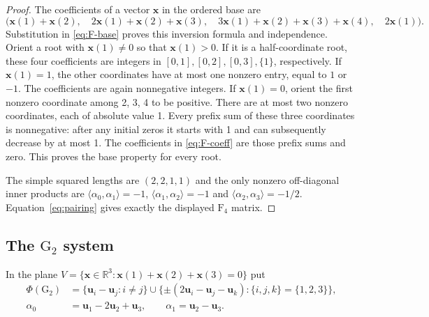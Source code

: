 \documentclass[11pt]{amsart}
\newcommand\re{{\mathbb R}}%
\newcommand\Zu{{\mathbf u}}
\newcommand\Zx{{\mathbf x}}
\newcommand\ip[2]{\langle#1,#2\rangle}
\theoremstyle{definition}
\newcommand{\typ}[1]{\mathrm{#1}}
\begin{document}
\begin{proof}
The coefficients of a vector $\Zx$ in the ordered base are
\begin{equation}\label{eq:F-coeff}
 \bigl(\Zx(1)+\Zx(2),\quad 2\Zx(1)+\Zx(2)+\Zx(3),\quad
 3\Zx(1)+\Zx(2)+\Zx(3)+\Zx(4),\quad 2\Zx(1)\bigr).
\end{equation}
Substitution in \eqref{eq:F-base} proves this inversion formula and
independence. Orient a root with $\Zx(1)\ne0$ so that
$\Zx(1)>0$. If it is a half-coordinate root, these four coefficients
are integers in $[0,1],[0,2],[0,3],\{1\}$, respectively.
If $\Zx(1)=1$, the other coordinates have at most one nonzero entry,
equal to $1$ or $-1$. The coefficients are again nonnegative integers.
If $\Zx(1)=0$, orient the first nonzero coordinate among 2, 3, 4 to be
positive. There are at most two nonzero coordinates, each of absolute
value 1. Every prefix sum of these three coordinates is nonnegative:
after any initial zeros it starts with 1 and can subsequently decrease
by at most 1.
The coefficients in \eqref{eq:F-coeff} are those prefix sums and zero.
This proves the base property for every root.

The simple squared lengths are $(2,2,1,1)$ and the only nonzero
off-diagonal inner products are
$\ip{\alpha_0}{\alpha_1}=-1$,
$\ip{\alpha_1}{\alpha_2}=-1$ and
$\ip{\alpha_2}{\alpha_3}=-1/2$.
Equation~\eqref{eq:pairing} gives exactly the displayed $\typ F_4$ matrix.
\end{proof}

\subsection{\texorpdfstring{The $\typ G_2$ system}{The G2 system}}

In the plane $V=\{\Zx\in\re^3:\Zx(1)+\Zx(2)+\Zx(3)=0\}$ put
\begin{align}
 \Phi(\typ G_2)&=\{\Zu_i-\Zu_j:i\ne j\}\cup
      \{\pm(2\Zu_i-\Zu_j-\Zu_k):\{i,j,k\}=\{1,2,3\}\},
       \label{eq:G-roots}\\
 \alpha_0&=\Zu_1-2\Zu_2+\Zu_3,\qquad
 \alpha_1=\Zu_2-\Zu_3.                                      \label{eq:G-base}
\end{align}
\end{document}
